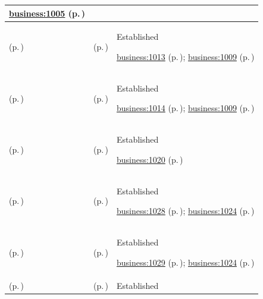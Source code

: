 \begin{longtable}{|>{\raggedright\arraybackslash}p{0.27\TableWidth}|>{\raggedright\arraybackslash}p{0.27\TableWidth}|>{\raggedright\arraybackslash}p{0.46\TableWidth}|}
 \hyperref[rad:business:1005]{business:1005} (p.\,\pageref{rad:business:1005})\\\hline
\nameref{cap:bc-governance-framework-management} (p.\,\pageref{cap:bc-governance-framework-management}) & \nameref{cap:bc-policy-obligation-governance} (p.\,\pageref{cap:bc-policy-obligation-governance}) & Established

 \hyperref[rad:business:1011]{business:1013} (p.\,\pageref{rad:business:1011}); \hyperref[rad:business:1009]{business:1009} (p.\,\pageref{rad:business:1009})\\\hline
\nameref{cap:bc-governance-framework-management} (p.\,\pageref{cap:bc-governance-framework-management}) & \nameref{cap:bc-authority-constraint-governance} (p.\,\pageref{cap:bc-authority-constraint-governance}) & Established

 \hyperref[rad:business:1011]{business:1014} (p.\,\pageref{rad:business:1011}); \hyperref[rad:business:1009]{business:1009} (p.\,\pageref{rad:business:1009})\\\hline
\nameref{cap:bc-health-service-governance} (p.\,\pageref{cap:bc-health-service-governance}) & \nameref{cap:bc-compliance-governance} (p.\,\pageref{cap:bc-compliance-governance}) & Established

 \hyperref[rad:business:1020]{business:1020} (p.\,\pageref{rad:business:1020})\\\hline
\nameref{cap:bc-compliance-governance} (p.\,\pageref{cap:bc-compliance-governance}) & \nameref{cap:bc-compliance-assessment-definition} (p.\,\pageref{cap:bc-compliance-assessment-definition}) & Established

 \hyperref[rad:business:1026]{business:1028} (p.\,\pageref{rad:business:1026}); \hyperref[rad:business:1024]{business:1024} (p.\,\pageref{rad:business:1024})\\\hline
\nameref{cap:bc-compliance-governance} (p.\,\pageref{cap:bc-compliance-governance}) & \nameref{cap:bc-governance-reporting-checkpoint-definition} (p.\,\pageref{cap:bc-governance-reporting-checkpoint-definition}) & Established

 \hyperref[rad:business:1026]{business:1029} (p.\,\pageref{rad:business:1026}); \hyperref[rad:business:1024]{business:1024} (p.\,\pageref{rad:business:1024})\\\hline
\nameref{cap:bc-health-service-assurance} (p.\,\pageref{cap:bc-health-service-assurance}) & \nameref{cap:bc-health-service-assurance-specification} (p.\,\pageref{cap:bc-health-service-assurance-specification}) & Established


\end{longtable}
